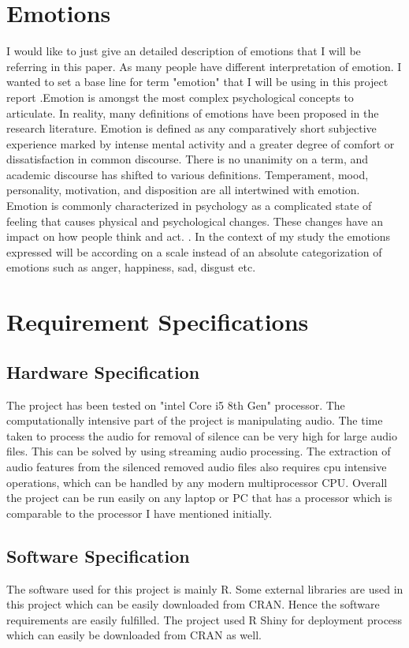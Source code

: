 \documentclass[11pt,a4paper]{article}
\begin{document}
	\section{Emotions}
	I would like to just give an detailed description of emotions that I will be referring in this paper. As many people have different interpretation of emotion. I wanted to set a base line for term "emotion" that I will be using in this project report .Emotion is amongst the most complex psychological concepts to articulate. In reality, many definitions of emotions have been proposed in the research literature. Emotion is defined as any comparatively short subjective experience marked by intense mental activity and a greater degree of comfort or dissatisfaction in common discourse. There is no unanimity on a term, and academic discourse has shifted to various definitions. Temperament, mood, personality, motivation, and disposition are all intertwined with emotion. Emotion is commonly characterized in psychology as a complicated state of feeling that causes physical and psychological changes. These changes have an impact on how people think and act. \cite{hoemann2020developing}. In the context of my study the emotions expressed will be according on a scale instead of an absolute categorization of emotions such as anger, happiness, sad, disgust etc.
	\section{Requirement Specifications}
	\subsection{Hardware Specification}
	The project has been tested on "intel Core i5 8th Gen" processor. The computationally intensive part of the project is manipulating audio. The time taken to process the audio for removal of silence can be very high for large audio files. This can be solved by using streaming audio processing. The extraction of audio features from the silenced removed audio files also requires cpu intensive operations, which can be handled by any modern multiprocessor CPU. Overall the project can be run easily on any laptop or PC that has a processor which is comparable to the processor I have mentioned initially.
	\subsection{Software Specification}
	The software used for this project is mainly R. Some external libraries are used in this project which can be easily downloaded from CRAN. Hence the software requirements are easily fulfilled. The project used R Shiny for deployment process which can easily be downloaded from CRAN as well.
\end{document}
